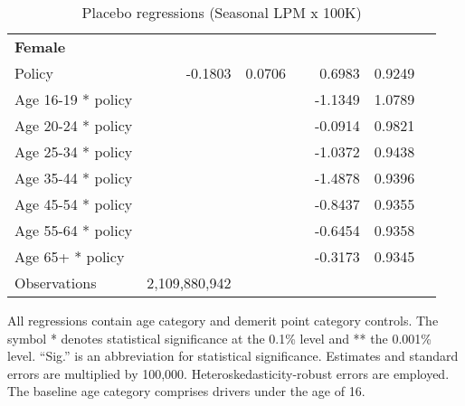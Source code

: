\begin{table}
\begin{tabular}{l r r l r r l}
\hline 

\textbf{Female} \\ 

Policy             &  -0.1803        &  0.0706       &            &  0.6983        &  0.9249       &            \\ 
Age 16-19 * policy           & & &  &  -1.1349        &  1.0789       &            \\ 
Age 20-24 * policy           & & &  &  -0.0914        &  0.9821       &            \\ 
Age 25-34 * policy           & & &  &  -1.0372        &  0.9438       &            \\ 
Age 35-44 * policy           & & &  &  -1.4878        &  0.9396       &            \\ 
Age 45-54 * policy           & & &  &  -0.8437        &  0.9355       &            \\ 
Age 55-64 * policy           & & &  &  -0.6454        &  0.9358       &            \\ 
Age 65+ * policy           & & &  &  -0.3173        &  0.9345       &            \\ 
Observations & 2,109,880,942  \\ 


\hline 

\end{tabular} 
\caption{Placebo regressions (Seasonal LPM x 100K)} 
All regressions contain age category and demerit point category controls. 
The symbol * denotes statistical significance at the 0.1\% level 
and ** the 0.001\% level. 
``Sig.'' is an abbreviation for statistical significance. 
Estimates and standard errors are multiplied by 100,000. 
Heteroskedasticity-robust errors are employed. 
The baseline age category comprises drivers under the age of 16. 
\label{tab:seas_LPMx100K_placebo_regs} 
\end{table} 
 

